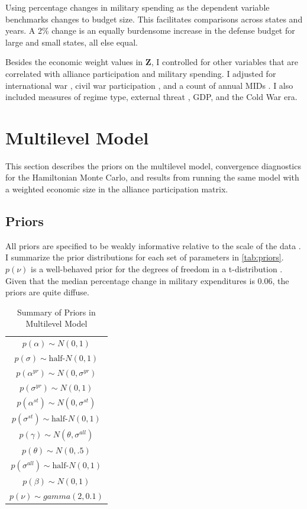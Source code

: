 \documentclass[12pt]{article}
\begin{document}
Using percentage changes in military spending as the dependent variable benchmarks changes to budget size. 
This facilitates comparisons across states and years. 
A 2\% change is an equally burdensome increase in the defense budget for large and small states, all else equal. 


Besides the economic weight values in \textbf{Z}, I controlled for other variables that are correlated with alliance participation and military spending. 
I adjusted for international war \citep{Reiteretal2016}, civil war participation \citep{SarkeesWayman2010}, and a count of annual MIDs \citep{Gibleretal2016}. 
I also included measures of regime type, external threat \citep{LeedsSavun2007}, GDP, and the Cold War era. 

 


\section{Multilevel Model}

This section describes the priors on the multilevel model, convergence diagnostics for the Hamiltonian Monte Carlo, and results from running the same model with a weighted economic size in the alliance participation matrix. 


\subsection{Priors} 

All priors are specified to be weakly informative relative to the scale of the data \citep{Gelmanetal2017}. 
I summarize the prior distributions for each set of parameters in \autoref{tab:priors}. 
$p(\nu)$ is a well-behaved prior for the degrees of freedom in a t-distribution \citep{JuarezSteele2010}. 
Given that the median percentage change in military expenditures is 0.06, the priors are quite diffuse. 


\begin{table} %
\begin{center}
\begin{tabular}{c} 
$ p(\alpha) \sim N(0, 1)$  \\
$ p(\sigma) \sim \mbox{half-}N(0, 1) $ \\
$ p(\alpha^{yr}) \sim N(0, \sigma^{yr}) $ \\ 
$ p(\sigma^{yr}) \sim N(0, 1) $ \\
$ p(\alpha^{st}) \sim N(0, \sigma^{st}) $ \\ 
$ p(\sigma^{st}) \sim \mbox{half-}N(0, 1) $ \\ 
$ p(\gamma) \sim N(\theta, \sigma^{all}) $ \\ 
$ p(\theta) \sim N(0, .5) $ \\
$ p(\sigma^{all}) \sim \mbox{half-}N(0, 1) $ \\
$ p(\beta) \sim N(0, 1) $ \\
$ p(\nu) \sim gamma(2, 0.1)$ 
\end{tabular} 
\caption{Summary of Priors in Multilevel Model} 
\label{tab:priors}
\end{center} 
\end{table} 
\end{document}
